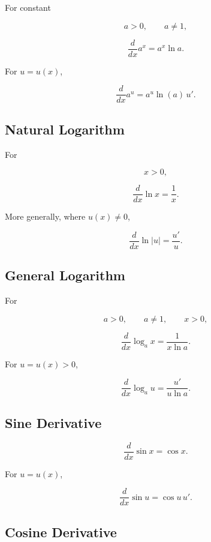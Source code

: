 For constant

\[
a>0,
\qquad
a\neq1,
\]

\[
\boxed{
\frac{d}{dx}a^x
=
a^x\ln a.
}
\]

For \(u=u(x)\),

\[
\boxed{
\frac{d}{dx}
a^{u}
=
a^u\ln(a)\,u'.
}
\]

\subsection{Natural Logarithm}
\label{subsec:natural-logarithm-derivative}

For

\[
x>0,
\]

\[
\boxed{
\frac{d}{dx}\ln x
=
\frac1x.
}
\]

More generally, where \(u(x)\neq0\),

\[
\boxed{
\frac{d}{dx}
\ln|u|
=
\frac{u'}{u}.
}
\]

\subsection{General Logarithm}
\label{subsec:general-logarithm-derivative}

For

\[
a>0,
\qquad
a\neq1,
\qquad
x>0,
\]

\[
\boxed{
\frac{d}{dx}
\log_a x
=
\frac{
1
}{
x\ln a
}.
}
\]

For \(u=u(x)>0\),

\[
\boxed{
\frac{d}{dx}
\log_a u
=
\frac{
u'
}{
u\ln a
}.
}
\]

\subsection{Sine Derivative}
\label{subsec:sine-derivative-reference}

\[
\boxed{
\frac{d}{dx}\sin x
=
\cos x.
}
\]

For \(u=u(x)\),

\[
\boxed{
\frac{d}{dx}\sin u
=
\cos u\,u'.
}
\]

\subsection{Cosine Derivative}
\label{subsec:cosine-derivative-reference}

